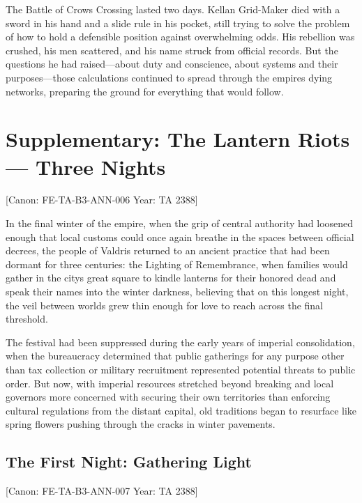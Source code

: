The Battle of Crow\textquotesingle s Crossing lasted two days. Kellan
Grid-Maker died with a sword in his hand and a slide rule in his pocket,
still trying to solve the problem of how to hold a defensible position
against overwhelming odds. His rebellion was crushed, his men scattered,
and his name struck from official records. But the questions he had
raised---about duty and conscience, about systems and their
purposes---those calculations continued to spread through the
empire\textquotesingle s dying networks, preparing the ground for
everything that would follow.

\section{Supplementary: The Lantern Riots --- Three
Nights}\label{supplementary-the-lantern-riots-three-nights}

{[}Canon: FE-TA-B3-ANN-006 \textbar{} Year: TA 2388{]}

In the final winter of the empire, when the grip of central authority
had loosened enough that local customs could once again breathe in the
spaces between official decrees, the people of Valdris returned to an
ancient practice that had been dormant for three centuries: the Lighting
of Remembrance, when families would gather in the city\textquotesingle s
great square to kindle lanterns for their honored dead and speak their
names into the winter darkness, believing that on this longest night,
the veil between worlds grew thin enough for love to reach across the
final threshold.

The festival had been suppressed during the early years of imperial
consolidation, when the bureaucracy determined that public gatherings
for any purpose other than tax collection or military recruitment
represented potential threats to public order. But now, with imperial
resources stretched beyond breaking and local governors more concerned
with securing their own territories than enforcing cultural regulations
from the distant capital, old traditions began to resurface like spring
flowers pushing through the cracks in winter pavements.

\subsection{The First Night: Gathering
Light}\label{the-first-night-gathering-light}

{[}Canon: FE-TA-B3-ANN-007 \textbar{} Year: TA 2388{]}

